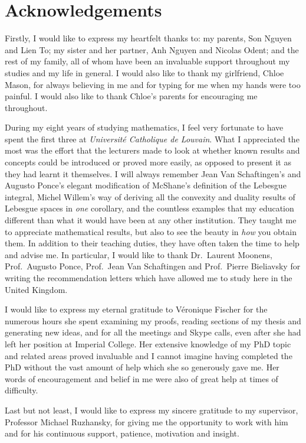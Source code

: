 \chapter*{Acknowledgements}

Firstly, I would like to express my heartfelt thanks to:
my parents, Son Nguyen and Lien To; my sister and her partner, Anh Nguyen and Nicolas Odent; and the rest of my family,
all of whom have been an invaluable support throughout my studies and my life in general.
I would also like to thank my girlfriend, Chloe Mason,
for always believing in me and for typing for me when my hands were too painful.
I would also like to thank Chloe's parents for encouraging me throughout.

During my eight years of studying mathematics,
I feel very fortunate to have spent the first three at \emph{Universit\'e Catholique de Louvain}.
What I appreciated the most was the effort that the lecturers made to look at
whether known results and concepts could be introduced or proved more easily,
as opposed to present it as they had learnt it themselves.
I will always remember Jean Van Schaftingen's and Augusto Ponce's elegant modification of McShane's definition of the Lebesgue integral,
Michel Willem's way of deriving all the convexity and duality results of Lebesgue spaces in \emph{one} corollary,
and the countless examples that my education different than what it would have been at any other institution.
They taught me to appreciate mathematical results,
but also to see the beauty in \emph{how} you obtain them.
In addition to their teaching duties,
they have often taken the time to help and advise me.
In particular,
I would like to thank Dr.\ Laurent Moonens,
Prof.\ Augusto Ponce, Prof.\ Jean Van Schaftingen and Prof.\ Pierre Bieliavsky for writing the recommendation letters which have allowed me to study here in the United Kingdom.

I would like to express my eternal gratitude to V\'eronique Fischer for the numerous hours she spent examining my proofs,
reading sections of my thesis and generating new ideas,
and for all the meetings and Skype calls,
even after she had left her position at Imperial College.
Her extensive knowledge of my PhD topic and related areas proved invaluable and
I cannot imagine having completed the PhD without the vast amount of help which she so generously gave me.
Her words of encouragement and belief in me were also of great help at times of difficulty.

Last but not least,
I would like to express my sincere gratitude to my supervisor,
Professor Michael Ruzhansky,
for giving me the opportunity to work with him and for his continuous support, patience, motivation and insight.
